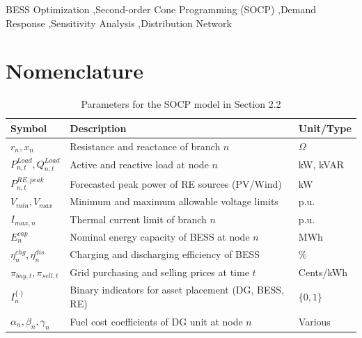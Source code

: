 \documentclass[preprint,12pt]{elsarticle}
\begin{document}
\begin{frontmatter}
\begin{abstract}
\end{abstract}

\begin{keyword}
 BESS Optimization \sep Second-order Cone Programming (SOCP) \sep Demand Response \sep Sensitivity Analysis \sep Distribution Network
\end{keyword}

\end{frontmatter}


\section*{Nomenclature}

\begin{table}[htbp]
\centering
\caption{Parameters for the SOCP model in Section 2.2}
\label{tab:parameters_socp}
\begin{tabularx}{\textwidth}{@{}l X l@{}}
\toprule
\textbf{Symbol} & \textbf{Description} & \textbf{Unit/Type} \\ \midrule
$r_n, x_n$ & Resistance and reactance of branch $n$ & $\Omega$ \\
$P_{n,t}^{Load}, Q_{n,t}^{Load}$ & Active and reactive load at node $n$ & kW, kVAR \\
$P_{n,t}^{RE,peak}$ & Forecasted peak power of RE sources (PV/Wind) & kW \\
$V_{min}, V_{max}$ & Minimum and maximum allowable voltage limits & p.u. \\
$I_{max,n}$ & Thermal current limit of branch $n$ & p.u. \\
$E_{n}^{cap}$ & Nominal energy capacity of BESS at node $n$ & MWh \\
$\eta_n^{chg}, \eta_n^{dis}$ & Charging and discharging efficiency of BESS & \% \\
$\pi_{buy,t}, \pi_{sell,t}$ & Grid purchasing and selling prices at time $t$ & Cents/kWh \\
$I_n^{\{\cdot\}}$ & Binary indicators for asset placement (DG, BESS, RE) & $\{0, 1\}$ \\
$\alpha_n, \beta_n, \gamma_n$ & Fuel cost coefficients of DG unit at node $n$ & Various \\ \bottomrule
\end{tabularx}
\end{table}
\end{document}
